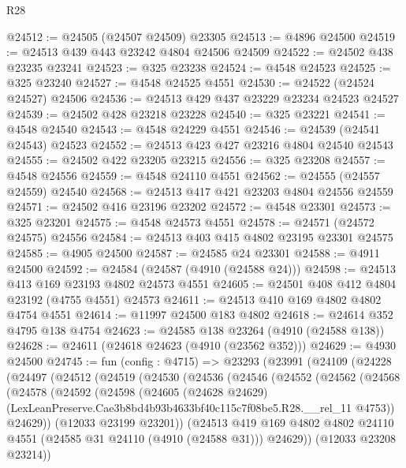 \begin{lexlean}{R28}
\begin{coremodule}
@24512 := @24505 (@24507 @24509) @23305
@24513 := @4896 @24500
@24519 := @24513 @439 @443 @23242 @4804 @24506 @24509
@24522 := @24502 @438 @23235 @23241
@24523 := @325 @23238
@24524 := @4548 @24523
@24525 := @325 @23240
@24527 := @4548 @24525 @4551
@24530 := @24522 (@24524 @24527) @24506
@24536 := @24513 @429 @437 @23229 @23234 @24523 @24527
@24539 := @24502 @428 @23218 @23228
@24540 := @325 @23221
@24541 := @4548 @24540
@24543 := @4548 @24229 @4551
@24546 := @24539 (@24541 @24543) @24523
@24552 := @24513 @423 @427 @23216 @4804 @24540 @24543
@24555 := @24502 @422 @23205 @23215
@24556 := @325 @23208
@24557 := @4548 @24556
@24559 := @4548 @24110 @4551
@24562 := @24555 (@24557 @24559) @24540
@24568 := @24513 @417 @421 @23203 @4804 @24556 @24559
@24571 := @24502 @416 @23196 @23202
@24572 := @4548 @23301
@24573 := @325 @23201
@24575 := @4548 @24573 @4551
@24578 := @24571 (@24572 @24575) @24556
@24584 := @24513 @403 @415 @4802 @23195 @23301 @24575
@24585 := @4905 @24500
@24587 := @24585 @24 @23301
@24588 := @4911 @24500
@24592 := @24584 (@24587 (@4910 (@24588 @24)))
@24598 := @24513 @413 @169 @23193 @4802 @24573 @4551
@24605 := @24501 @408 @412 @4804 @23192 (@4755 @4551) @24573
@24611 := @24513 @410 @169 @4802 @4802 @4754 @4551
@24614 := @11997 @24500 @183 @4802
@24618 := @24614 @352 @4795 @138 @4754
@24623 := @24585 @138 @23264 (@4910 (@24588 @138))
@24628 := @24611 (@24618 @24623 (@4910 (@23562 @352)))
@24629 := @4930 @24500
@24745 := fun (config : @4715) =>
  @23293
    (@23991
      (@24109
        (@24228
          (@24497
            (@24512
              (@24519
                (@24530
                  (@24536
                    (@24546
                      (@24552
                        (@24562
                          (@24568
                            (@24578
                              (@24592
                                (@24598
                                  (@24605
                                    (@24628 @24629)
                                    (LexLeanPreserve.Cae3b8bd4b93b4633bf40c115c7f08be5.R28.__rel_11
                                      @4753))
                                  @24629))
                              (@12033 @23199 @23201))
                            (@24513
                              @419
                              @169
                              @4802
                              @4802
                              @24110
                              @4551
                              (@24585 @31 @24110 (@4910 (@24588 @31)))
                              @24629))
                          (@12033 @23208 @23214))

\end{coremodule}
\end{lexlean}
